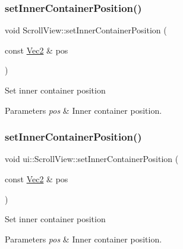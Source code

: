 \subsubsection{\texorpdfstring{set\+Inner\+Container\+Position()}{setInnerContainerPosition()}\hspace{0.1cm}{\footnotesize\ttfamily [1/2]}}
{\footnotesize\ttfamily void Scroll\+View\+::set\+Inner\+Container\+Position (\begin{DoxyParamCaption}\item[{const \hyperlink{classVec2}{Vec2} \&}]{pos }\end{DoxyParamCaption})}

Set inner container position


\begin{DoxyParams}{Parameters}
{\em pos} & Inner container position. \\
\hline
\end{DoxyParams}
\mbox{\label{classui_1_1ScrollView_a286b3b588fea746f84d10f0ee6a45b6b}} 
\subsubsection{\texorpdfstring{set\+Inner\+Container\+Position()}{setInnerContainerPosition()}\hspace{0.1cm}{\footnotesize\ttfamily [2/2]}}
{\footnotesize\ttfamily void ui\+::\+Scroll\+View\+::set\+Inner\+Container\+Position (\begin{DoxyParamCaption}\item[{const \hyperlink{classVec2}{Vec2} \&}]{pos }\end{DoxyParamCaption})}

Set inner container position


\begin{DoxyParams}{Parameters}
{\em pos} & Inner container position. \\
\hline
\end{DoxyParams}
\mbox{\label{classui_1_1ScrollView_a783880c25817f9bf15abc463e34ca413}} 
